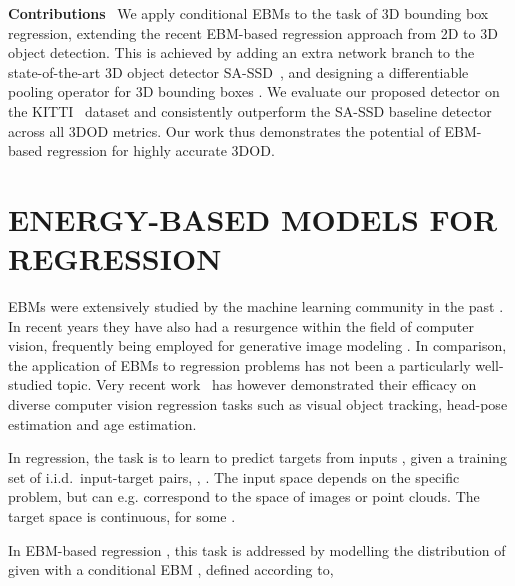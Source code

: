 \documentclass[letterpaper, 10 pt, conference]{ieeeconf}
\newcommand{\parsection}[1]{\vspace{2mm}\noindent\textbf{#1}~ }
\begin{document}
\parsection{Contributions}
We apply conditional EBMs  to the task of 3D bounding box regression, extending the recent EBM-based regression approach \cite{gustafsson2019learning, danelljan2020probabilistic, gustafsson2020train} from 2D to 3D object detection. This is achieved by adding an extra network branch to the state-of-the-art 3D object detector SA-SSD~\cite{he2020structure}, and designing a differentiable pooling operator for 3D bounding boxes . We evaluate our proposed detector on the KITTI~\cite{geiger2012we} dataset and consistently outperform the SA-SSD baseline detector across all 3DOD metrics. Our work thus demonstrates the potential of EBM-based regression for highly accurate 3DOD.














 \section{ENERGY-BASED MODELS FOR REGRESSION}
\label{section:ebms_regression}

EBMs were extensively studied by the machine learning community in the past \cite{lecun2006tutorial, teh2003energy, bengio2003neural, mnih2005learning, hinton2006unsupervised, osadchy2005synergistic}. In recent years they have also had a resurgence within the field of computer vision, frequently being employed for generative image modeling \cite{xie2016theory, gao2018learning, nijkamp2019learning, du2019implicit, Grathwohl2020Your, gao2020flow, pang2020learning, bao2020bi}. In comparison, the application of EBMs to regression problems has not been a particularly well-studied topic.  Very recent work~\cite{gustafsson2019learning, danelljan2020probabilistic, gustafsson2020train} has however demonstrated their efficacy on diverse computer vision regression tasks such as visual object tracking, head-pose estimation and age estimation.

In regression, the task is to learn to predict targets  from inputs , given a training set  of i.i.d.\ input-target pairs, , . The input space  depends on the specific problem, but can e.g. correspond to the space of images or point clouds. The target space  is continuous,  for some .

In EBM-based regression \cite{gustafsson2019learning, danelljan2020probabilistic, gustafsson2020train}, this task is addressed by modelling the distribution  of  given  with a conditional EBM , defined according to,
\end{document}
